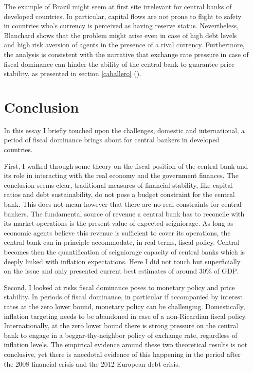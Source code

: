 \documentclass[american]{scrartcl}
\begin{document}
The example of Brazil might seem at first site irrelevant for central banks of developed countries. In particular, capital flows are not prone to flight to safety in countries who's currency is perceived as having reserve status. Nevertheless, Blanchard shows that the problem might arise even in case of high debt levels and high risk aversion of agents in the presence of a rival currency. Furthermore, the analysis is consistent with the narrative that exchange rate pressure in case of fiscal dominance can hinder the ability of the central bank to guarantee price stability, as presented in section \ref{caballero} (\cite{Caballero2016}).

\section{Conclusion}

In this essay I briefly touched upon the challenges, domestic and international, a period of fiscal dominance brings about for central bankers in developed countries.

First, I walked through some theory on the fiscal position of the central bank and its role in interacting with the real economy and the government finances. The conclusion seems clear, traditional measures of financial stability, like capital ratios and debt sustainability, do not pose a budget constraint for the central bank. This does not mean however that there are no real constraints for central bankers. The fundamental source of revenue a central bank has to reconcile with its market operations is the present value of expected seigniorage. As long as economic agents believe this revenue is sufficient to cover its operations, the central bank can in principle accommodate, in real terms, fiscal policy. Central becomes then the quantification of seigniorage capacity of central banks which is deeply linked with inflation expectations. Here I did not touch but superficially on the issue and only presented current best estimates of around 30\% of GDP.

Second, I looked at risks fiscal dominance poses to monetary policy and price stability. In periods of fiscal dominance, in particular if accompanied by interest rates at the zero lower bound, monetary policy can be challenging. Domestically, inflation targeting needs to be abandoned in case of a non-Ricardian fiscal policy. Internationally, at the zero lower bound there is strong pressure on the central bank to engage in a beggar-thy-neighbor policy of exchange rate, regardless of inflation levels. The empirical evidence around these two theoretical results is not conclusive, yet there is anecdotal evidence of this happening in the period after the 2008 financial crisis and the 2012 European debt crisis.
\end{document}
